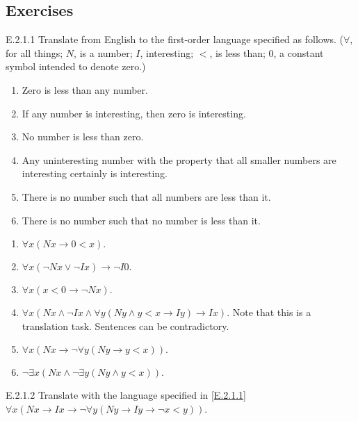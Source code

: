 \subsection*{Exercises}

\begin{exercise}{E.2.1.1}
  Translate from English to the first-order language specified as follows. ($\forall$, for all things; $N$, is a number; $I$, interesting; $<$, is less than; $0$, a constant symbol intended to denote zero.)
  \begin{enumerate}[label=(\alph*)]
    \item Zero is less than any number.
    \item If any number is interesting, then zero is interesting.
    \item No number is less than zero.
    \item Any uninteresting number with the property that all smaller numbers are interesting certainly is interesting.
    \item There is no number such that all numbers are less than it.
    \item There is no number such that no number is less than it.\qedhere
  \end{enumerate}
\end{exercise}

\begin{enumerate}
  \item \(
        \forall x(Nx\rightarrow 0<x).
        \)
  \item \(
        \forall x (\neg Nx\vee\neg Ix )\rightarrow \neg I0.
        \)
  \item \(
        \forall x (x<0\rightarrow\neg Nx).
        \)
  \item \(
        \forall x(Nx\wedge\neg Ix\wedge\forall y (Ny\wedge y<x\rightarrow Iy)\rightarrow Ix).
        \) Note that this is a translation task. Sentences can be contradictory.
  \item \(
        \forall x(Nx\rightarrow\neg\forall y(Ny\rightarrow y<x)).
        \)
  \item \(
        \neg\exists x(Nx\wedge\neg\exists y(Ny\wedge y<x)).
        \)
\end{enumerate}

\begin{exercise}{E.2.1.2}
  Translate with the language specified in \ref{E.2.1.1} $\forall x(Nx\rightarrow Ix\rightarrow\neg\forall y(Ny\rightarrow Iy\rightarrow\neg x<y))$.
\end{exercise}

